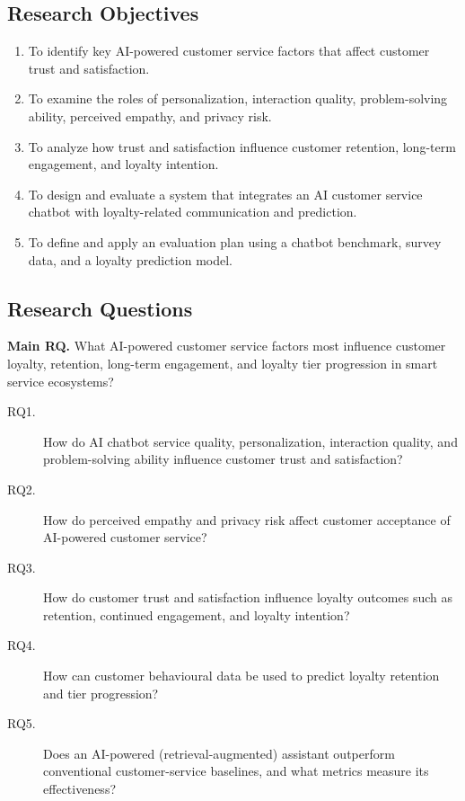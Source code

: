 \documentclass[runningheads]{llncs}
\begin{document}
\subsection{Research Objectives}

\begin{enumerate}
\item To identify key AI-powered customer service factors that affect customer trust and satisfaction.
\item To examine the roles of personalization, interaction quality, problem-solving ability, perceived empathy, and privacy risk.
\item To analyze how trust and satisfaction influence customer retention, long-term engagement, and loyalty intention.
\item To design and evaluate a system that integrates an AI customer service chatbot with loyalty-related communication and prediction.
\item To define and apply an evaluation plan using a chatbot benchmark, survey data, and a loyalty prediction model.
\end{enumerate}

\subsection{Research Questions}

\noindent\textbf{Main RQ.} What AI-powered customer service factors most influence customer loyalty, retention, long-term engagement, and loyalty tier progression in smart service ecosystems?

\begin{description}
\item[RQ1.] How do AI chatbot service quality, personalization, interaction quality, and problem-solving ability influence customer trust and satisfaction?
\item[RQ2.] How do perceived empathy and privacy risk affect customer acceptance of AI-powered customer service?
\item[RQ3.] How do customer trust and satisfaction influence loyalty outcomes such as retention, continued engagement, and loyalty intention?
\item[RQ4.] How can customer behavioural data be used to predict loyalty retention and tier progression?
\item[RQ5.] Does an AI-powered (retrieval-augmented) assistant outperform conventional customer-service baselines, and what metrics measure its effectiveness?
\end{description}
\end{document}
